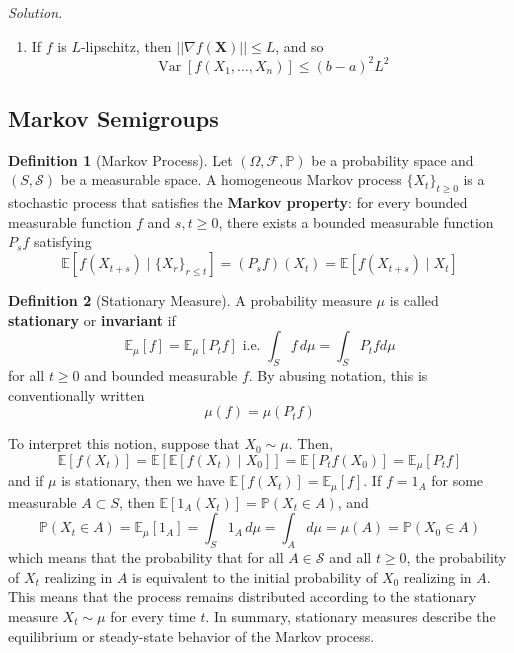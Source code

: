 \documentclass{article}
\DeclareMathOperator{\Var}{Var}
\theoremstyle{definition}
\theoremstyle{remark}
\theoremstyle{definition}
\newtheorem{definition}{Definition}[section]
\newenvironment{solution}{\noindent \textit{Solution.}}{}
\begin{document}
\begin{solution}
\begin{enumerate}
    \item If $f$ is $L$-lipschitz, then $||\nabla f(\mathbf{X})|| \leq L$, and so  
    \[\Var[f(X_1, \ldots, X_n)] \leq (b - a)^2 L^2\]
\end{enumerate}
\end{solution}

\subsection{Markov Semigroups}

\begin{definition}[Markov Process]
Let $(\Omega, \mathcal{F}, \mathbb{P})$ be a probability space and $(S, \mathcal{S})$ be a measurable space. A homogeneous Markov process $\{X_t\}_{t \geq 0}$ is a stochastic process that satisfies the \textbf{Markov property}: for every bounded measurable function $f$ and $s, t \geq 0$, there exists a bounded measurable function $P_s f$ satisfying 
\[\mathbb{E}[f (X_{t + s}) \mid \{X_r\}_{r \leq t}] = (P_s f) (X_t) = \mathbb{E}[ f(X_{t + s}) \mid X_t]\]
\end{definition}

\begin{definition}[Stationary Measure]
A probability measure $\mu$ is called \textbf{stationary} or \textbf{invariant} if 
\[\mathbb{E}_\mu[f] = \mathbb{E}_\mu [P_t f] \text{ i.e. } \int_S f \,d \mu = \int_S P_t f d\mu\]
for all $t \geq 0$ and bounded measurable $f$. By abusing notation, this is conventionally written 
\[\mu(f) = \mu(P_t f)\]
\end{definition}

To interpret this notion, suppose that $X_0 \sim \mu$. Then, 
\[\mathbb{E}[f(X_t)] = \mathbb{E}[\mathbb{E}[f(X_t) \mid X_0]] = \mathbb{E}[P_t f (X_0)] = \mathbb{E}_\mu [P_t f]\]
and if $\mu$ is stationary, then we have $\mathbb{E}[f(X_t)] = \mathbb{E}_\mu [f]$. If $f = 1_A$ for some measurable $A \subset S$, then $\mathbb{E}[1_A (X_t)] = \mathbb{P}(X_t \in A)$, and 
\[\mathbb{P}(X_t \in A) = \mathbb{E}_\mu [1_A] = \int_S 1_A \,d\mu = \int_A d\mu = \mu(A) = \mathbb{P}(X_0 \in A)\]
which means that the probability that for all $A \in \mathcal{S}$ and all $t \geq 0$, the probability of $X_t$ realizing in $A$ is equivalent to the initial probability of $X_0$ realizing in $A$. This means that the process remains distributed according to the stationary measure $X_t \sim \mu$ for every time $t$. In summary, stationary measures describe the equilibrium or steady-state behavior of the Markov process.  
\end{document}
